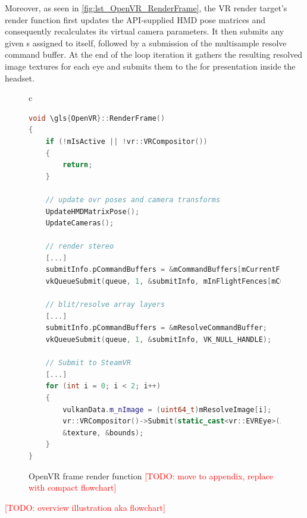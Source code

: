 Moreover, as seen in \autoref{fig:lst_OpenVR_RenderFrame}, the \gls{VR} render target's  render function first updates the API-supplied \gls{HMD} pose matrices and consequently recalculates its virtual camera parameters. It then submits any given s assigned to itself, followed by a submission of the multisample resolve command buffer. At the end of the loop iteration it gathers the resulting resolved image textures for each eye and submits them to the  for presentation inside the headset. \\

\begin{figure}[htb]
  \centering
  \begin{tabular}{c}
  \begin{lstlisting}[language=C++]
void \gls{OpenVR}::RenderFrame()
{
	if (!mIsActive || !vr::VRCompositor())
	{
		return;
	}

	// update ovr poses and camera transforms
	UpdateHMDMatrixPose();
	UpdateCameras();

	// render stereo
	[...]
	submitInfo.pCommandBuffers = &mCommandBuffers[mCurrentFrame];
	vkQueueSubmit(queue, 1, &submitInfo, mInFlightFences[mCurrentFrame]);

	// blit/resolve array layers
	[...]
	submitInfo.pCommandBuffers = &mResolveCommandBuffer;
	vkQueueSubmit(queue, 1, &submitInfo, VK_NULL_HANDLE);

	// Submit to SteamVR
	[...]
	for (int i = 0; i < 2; i++)
	{
		vulkanData.m_nImage = (uint64_t)mResolveImage[i];
		vr::VRCompositor()->Submit(static_cast<vr::EVREye>(i), 
		&texture, &bounds);
	}
}
	\end{lstlisting}
  \end{tabular}
  \caption[\gls{OpenVR} render target's RenderFrame]{\gls{OpenVR} frame render function \textcolor{red}{[TODO: move to appendix, replace with compact flowchart]}}\label{fig:lst_OpenVR_RenderFrame}
\end{figure}

\textcolor{red}{[TODO: overview illustration aka flowchart]}